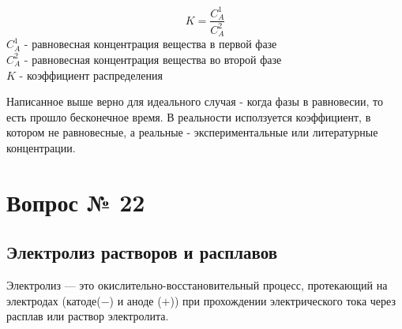 \documentclass[14pt,a4paper]{scrartcl}
\begin{document}
$$K = \frac{C_A^1}{C_A^2}$$
$C_A^1$ - равновесная концентрация вещества в первой фазе\\
$C_A^2$ - равновесная концентрация вещества во второй фазе\\
$K$ - коэффициент распределения

Написанное выше верно для идеального случая - когда фазы в равновесии, то есть прошло бесконечное время. В реальности исползуется коэффициент, в котором не равновесные, а реальные - экспериментальные или литературные концентрации.


\section*{Вопрос № 22}
\subsection*{Электролиз растворов и расплавов}
Электролиз — это окислительно-восстановительный процесс, протекающий на электродах (катоде($-$) и аноде ($+$))
при прохождении электрического тока через расплав или раствор электролита. \\
\end{document}
